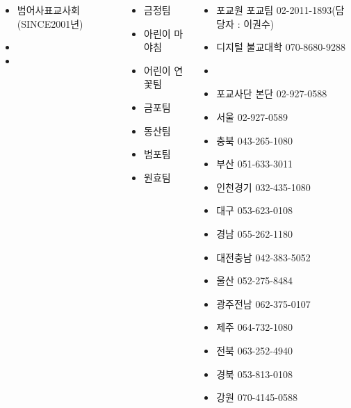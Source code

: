 \documentclass[	20pt, 
							a1paper, 
							portrait, %
							margin=0mm, %
							innermargin=10mm,  		%
							blockverticalspace=4mm, %
							colspace=5mm, 
							subcolspace=0mm
							]{tikzposter}
\begin{document}
\begin{columns}
{			\begin{itemize}
			\item [밴드] 범어사표교사회 (SINCE2001년)
			\item [카톡] 
			\item [홈페이지] 
			\end{itemize}

		}


		{
			\setlength{\leftmargini}{8em}			
			\setlength{\labelsep}{1em} %

			\begin{itemize}
			\item 금정팀
			\item 아린이 마야침
			\item 어린이 연꽃팀
			\item 금포팀
			\item 동산팀
			\item 범포팀
			\item 원효팀

			\end{itemize}
		}


		{
			\setlength{\leftmargini}{3em}			
			\setlength{\labelsep}{1em} %
			\begin{itemize}
			\item 포교원 포교팀 02-2011-1893(담당자 : 이권수)
			\item 디지털 불교대학 070-8680-9288
			\item 			
			\item 포교사단 본단 02-927-0588
			\item 서울 02-927-0589
			\item 충북 043-265-1080
			\item 부산 051-633-3011
			\item 인천경기 032-435-1080
			\item 대구 053-623-0108
			\item 경남 055-262-1180
			\item 대전충남 042-383-5052
			\item 울산 052-275-8484
			\item 광주전남 062-375-0107
			\item 제주 064-732-1080
			\item 전북 063-252-4940
			\item 경북 053-813-0108
			\item 강원 070-4145-0588
			\end{itemize}
		}		





\end{columns}
\end{document}
